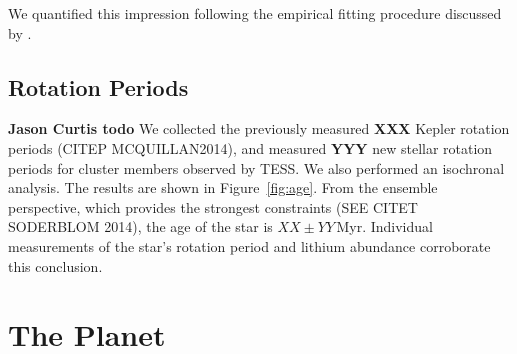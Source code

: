 \documentclass[12pt,modern,twocolumn,tighten]{aastex63}
\begin{document}
We quantified this impression following the empirical fitting procedure
discussed by \citet{gagne_mutau_2020}.


\subsection{Rotation Periods}
{\bf Jason Curtis todo}
We collected the previously measured
{\bf XXX} Kepler rotation periods (CITEP MCQUILLAN2014), and measured
{\bf YYY} new stellar rotation periods for cluster members observed by
TESS.  We also performed an isochronal analysis.  The results are
shown in Figure~\ref{fig:age}.  From the ensemble perspective, which
provides the strongest constraints (SEE CITET SODERBLOM 2014), the age
of the star is $XX \pm YY$\,Myr.  Individual measurements of the
star's rotation period and lithium abundance corroborate this
conclusion.



\section{The Planet}
\label{sec:planet}
\end{document}
